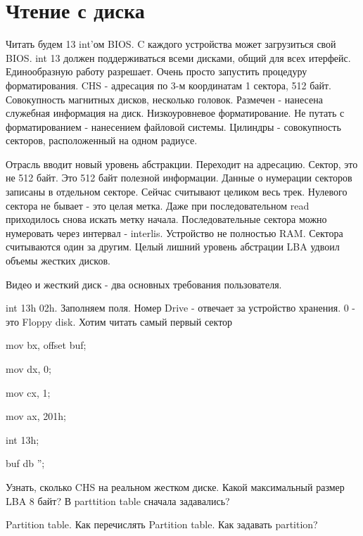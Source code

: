 \section{Чтение с диска}
Читать будем 13 int'ом BIOS. C каждого устройства может загрузиться свой BIOS. int 13 должен поддерживаться всеми дисками, общий для всех итерфейс. Единообразную работу разрешает. Очень просто запустить процедуру форматирования. CHS - адресация по 3-м координатам 1 сектора, 512 байт. Совокупность магнитных дисков, несколько головок. Размечен - нанесена служебная информация на диск. Низкоуровневое форматирование. Не путать с форматированием - нанесением файловой системы. Цилиндры - совокупность секторов, расположенный на одном радиусе.

Отрасль вводит новый уровень абстракции. Переходит на адресацию. Сектор, это не 512 байт. Это 512 байт полезной информации. Данные о нумерации секторов записаны в отдельном секторе. Сейчас считывают целиком весь трек. Нулевого сектора не бывает - это целая метка. Даже при последовательном read приходилось снова искать метку начала. Последовательные сектора можно нумеровать через интервал - interlis. Устройство не полностью RAM. Сектора считываются один за другим. Целый лишний уровень абстрации LBA удвоил объемы жестких дисков.

Видео и жесткий диск - два основных требования пользователя.

int 13h 02h. Заполняем поля. Номер Drive - отвечает за устройство хранения. 0 - это Floppy disk.
Хотим читать самый первый сектор

mov bx, offset buf;

mov dx, 0;

mov cx, 1;

mov ax, 201h;

int 13h;

buf db '';

Узнать, сколько CHS на реальном жестком диске. Какой максимальный размер LBA 8 байт?
В parttition table сначала задавались?

Partition table. Как перечислять Partition table. Как задавать partition?
 
